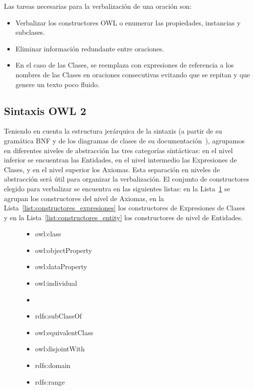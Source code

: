 Las tareas necesarias para la verbalización de una oración son:
\begin{itemize}
    \item Verbalizar los constructores OWL o enumerar las propiedades, instancias y subclases.
    \item Eliminar información redundante entre oraciones.
    \item En el caso de las Clases, se reemplaza con expresiones de referencia a los nombres de las Clases en oraciones consecutivas evitando que se repitan y que genere un texto poco fluido.
\end{itemize}

\subsection{Sintaxis OWL 2}
\label{sec:gen_doc_sintaxis_owl}
Teniendo en cuenta la estructura jerárquica de la sintaxis (a partir de su gramática BNF y de los diagramas de clases de su documentación~\cite{OWL2W3C}), agrupamos en diferentes niveles de abstracción las tres categorías sintácticas: en el nivel inferior se encuentran las Entidades, en el nivel intermedio las Expresiones de Clases, y en el nivel superior los Axiomas. Esta separación en niveles de abstracción será útil para organizar la verbalización. El conjunto de constructores elegido para verbalizar se encuentra en las siguientes listas: en la Lista~\ref{list:constructores_axiomas} se agrupan los constructores del nivel de Axiomas, en la Lista~\ref{list:constructores_expresiones} los constructores de Expresiones de Clases y en la Lista~\ref{list:constructores_entity} los constructores de nivel de Entidades.
\begin{figure}
\begin{multicols}{2}
\label{list:constructores_entity}
    \begin{itemize}
        \item owl:class
        \item owl:objectProperty
        \item owl:dataProperty
        \item owl:individual
        \item[\vspace{\fill}]
    \end{itemize}

\label{list:constructores_axiomas}
    \begin{itemize}
        \item rdfs:subClassOf
        \item owl:equivalentClass
        \item owl:disjointWith
        \item rdfs:domain
        \item rdfs:range
    \end{itemize}
    \end{multicols}
\end{figure}


